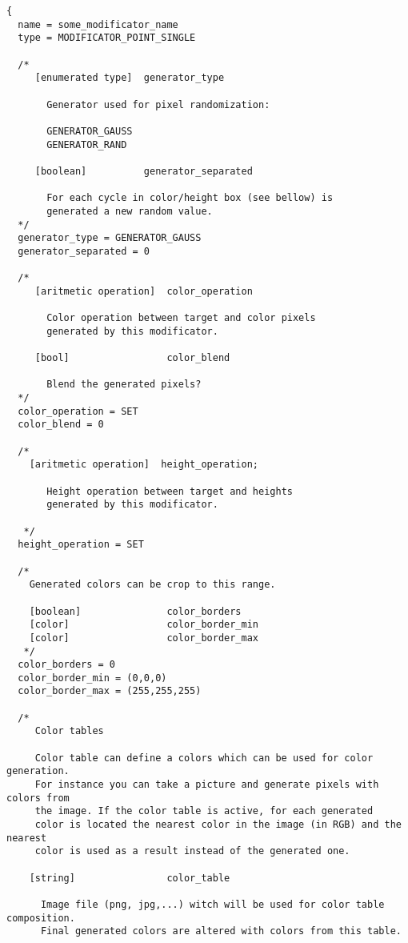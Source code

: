 \documentclass[9pt]{article}
\begin{document}
\begin{verbatim}
{
  name = some_modificator_name
  type = MODIFICATOR_POINT_SINGLE

  /*    
     [enumerated type]  generator_type
     
       Generator used for pixel randomization:
       
       GENERATOR_GAUSS
       GENERATOR_RAND
      
     [boolean]          generator_separated
     
       For each cycle in color/height box (see bellow) is
       generated a new random value.
  */
  generator_type = GENERATOR_GAUSS
  generator_separated = 0
    
  /*      
     [aritmetic operation]  color_operation
     
       Color operation between target and color pixels 
       generated by this modificator.
     
     [bool]                 color_blend
     
       Blend the generated pixels?
  */      
  color_operation = SET
  color_blend = 0
  
  /*      
    [aritmetic operation]  height_operation;
    
       Height operation between target and heights
       generated by this modificator.
    
   */
  height_operation = SET

  /*
    Generated colors can be crop to this range.
  
    [boolean]               color_borders
    [color]                 color_border_min
    [color]                 color_border_max
   */
  color_borders = 0
  color_border_min = (0,0,0)
  color_border_max = (255,255,255)
  
  /*
     Color tables 
     
     Color table can define a colors which can be used for color generation. 
     For instance you can take a picture and generate pixels with colors from
     the image. If the color table is active, for each generated
     color is located the nearest color in the image (in RGB) and the nearest 
     color is used as a result instead of the generated one.
     
    [string]                color_table
      
      Image file (png, jpg,...) witch will be used for color table composition. 
      Final generated colors are altered with colors from this table.
    

\end{verbatim}
\end{document}
